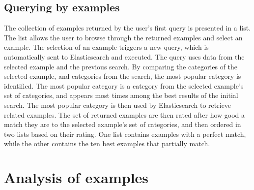 \subsection{Querying by examples}
The collection of examples returned by the user's first query is presented in a list. The list allows the user to browse through the returned examples and select an example. The selection of an example triggers a new query, which is automatically sent to Elasticsearch and executed. The query uses data from the selected example and the previous search. By comparing the categories of the selected example, and categories from the search, the most popular category is identified. The most popular category is a category from the selected example's set of categories, and appears most times among the best results of the initial search. The most popular category is then used by Elasticsearch to retrieve related examples. The set of returned examples are then rated after how good a match they are to the selected example's set of categories, and then ordered in two lists based on their rating. One list contains examples with a perfect match, while the other contains the ten best examples that partially match.


\section{Analysis of examples} \label{examples-section} %

